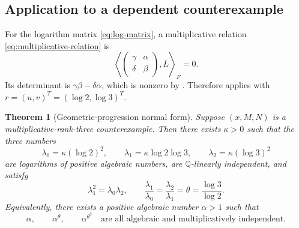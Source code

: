 \documentclass[11pt]{article}
\newtheorem{theorem}{Theorem}[section]
\theoremstyle{definition}
\theoremstyle{remark}
\newcommand{\Q}{\mathbb{Q}}
\begin{document}
\subsection{Application to a dependent counterexample}

For the logarithm matrix \eqref{eq:log-matrix}, a multiplicative relation
\eqref{eq:multiplicative-relation} is
\[
 \left\langle
 \begin{pmatrix}\gamma&\alpha\\\delta&\beta\end{pmatrix},
 L\right\rangle_F=0.
\]
Its determinant is $\gamma\beta-\delta\alpha$, which is nonzero by
.  Therefore  applies with
$r=(u,v)^T=(\log2,\log3)^T$.

\begin{theorem}[Geometric-progression normal form]
\label{thm:gp-normal-form}
Suppose $(x,M,N)$ is a multiplicative-rank-three counterexample.  Then there exists
$\kappa>0$ such that the three numbers
\begin{equation}
 \lambda_0=\kappa(\log2)^2,
 \qquad
 \lambda_1=\kappa\log2\log3,
 \qquad
 \lambda_2=\kappa(\log3)^2
 \label{eq:lambda-progression}
\end{equation}
are logarithms of positive algebraic numbers, are $\Q$-linearly independent, and satisfy
\begin{equation}
 \lambda_1^2=\lambda_0\lambda_2,
 \qquad
 \frac{\lambda_1}{\lambda_0}
 =\frac{\lambda_2}{\lambda_1}
 =\theta=\frac{\log3}{\log2}.
 \label{eq:gp-logs}
\end{equation}
Equivalently, there exists a positive algebraic number $\alpha>1$ such that
\begin{equation}
 \alpha,\qquad \alpha^\theta,\qquad \alpha^{\theta^2}
 \quad\text{are all algebraic and multiplicatively independent.}
 \label{eq:theta-orbit}
\end{equation}
\end{theorem}
\end{document}
